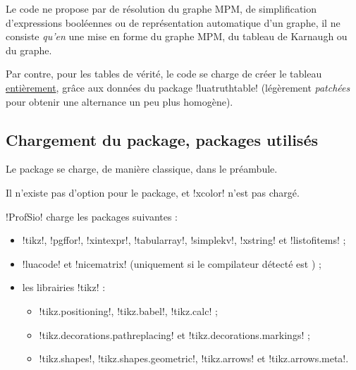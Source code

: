 \documentclass[french,a4paper,11pt]{article}
\begin{document}
{{\begin{warningblock}
Le code ne propose par de \og résolution \fg{} du graphe MPM, de \og simplification \fg{} d'expressions booléennes ou de représentation \og automatique \fg{} d'un graphe, il ne consiste \textit{qu'en} une mise en forme du graphe MPM, du tableau de Karnaugh ou du graphe.

\smallskip

Par contre, pour les tables de vérité, le code se charge de créer le tableau \underline{entièrement}, grâce aux données du package \packagetex!luatruthtable! (légèrement \textit{patchées} pour obtenir une alternance un peu plus homogène).
\end{warningblock}

\subsection{Chargement du package, packages utilisés}

\begin{importantblock}
Le package se charge, de manière classique, dans le préambule.

Il n'existe pas d'option pour le package, et \packagetex!xcolor! n'est pas chargé.
\end{importantblock}


\begin{noteblock}
\packagetex!ProfSio! charge les packages suivantes :

\begin{itemize}
	\item \packagetex!tikz!, \packagetex!pgffor!, \packagetex!xintexpr!, \packagetex!tabularray!, \packagetex!simplekv!, \packagetex!xstring! et \packagetex!listofitems! ;
	\item \packagetex!luacode! et \packagetex!nicematrix! (uniquement si le compilateur détecté est ) ;
	\item les librairies \packagetex!tikz! :
	\begin{itemize}
		\item \motcletex!tikz.positioning!, \motcletex!tikz.babel!, \motcletex!tikz.calc! ;
		\item \motcletex!tikz.decorations.pathreplacing! et \motcletex!tikz.decorations.markings! ;
		\item \motcletex!tikz.shapes!, \motcletex!tikz.shapes.geometric!, \motcletex!tikz.arrows! et \motcletex!tikz.arrows.meta!.
	\end{itemize}
\end{itemize}


\end{noteblock}}}
\end{document}
